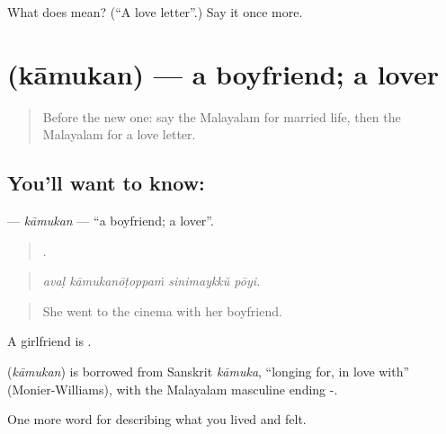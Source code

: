 \begin{tcolorbox}[breakable,colback=teal!4,colframe=teal!35!black,title={Before you move on}]
What does  mean? (\textquotedblleft{}A love letter\textquotedblright{}.) Say it once more.
\end{tcolorbox}
\section[\texorpdfstring{\ml{കാമുകൻ} (kāmukan)}{കാമുകൻ (kāmukan)}]{ (kāmukan) — a boyfriend; a lover}

\label{lesson:ML-C552-kamukan}



\begin{quote}
Before the new one: say the Malayalam for married life, then the Malayalam for a love letter.
\end{quote}

\subsection*{You'll want to know: }
\textbf{} — \emph{kāmukan} — \textquotedblleft{}a boyfriend; a lover\textquotedblright{}.

\begin{quote}
   .
\end{quote}

\begin{quote}
\emph{avaḷ kāmukanōṭoppaṁ sinimaykkŭ pōyi.}
\end{quote}

\begin{quote}
She went to the cinema with her boyfriend.
\end{quote}

A girlfriend is .

\begin{cousinweb}
\textbf{} (\emph{kāmukan}) is borrowed from Sanskrit \emph{kāmuka}, \textquotedblleft{}longing for, in love with\textquotedblright{} (Monier-Williams), with the Malayalam masculine ending -.
\end{cousinweb}

\begin{grammarlens}[title={What you've built}]
One more word for describing what you lived and felt.
\end{grammarlens}

